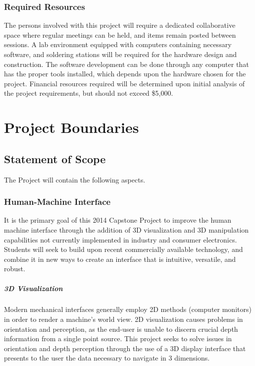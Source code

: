 \documentclass[11pt]{report}
\begin{document}
\subsection{Required Resources}
The persons involved with this project will require a dedicated collaborative space where regular meetings can be held, and items remain posted between sessions.
A lab environment equipped with computers containing necessary software, and soldering stations will be required for the hardware design and construction.
The software development can be done through any computer that has the proper tools installed, which depends upon the hardware chosen for the project.
Financial resources required will be determined upon initial analysis of the project requirements, but should not exceed \$5,000.

\chapter{Project Boundaries}
\section{Statement of Scope}
The Project will contain the following aspects.

\subsection{Human-Machine Interface}
It is the primary goal of this 2014 Capstone Project to improve the human machine interface through the addition of 3D visualization and 3D manipulation capabilities not currently implemented in industry and consumer electronics.
Students will seek to build upon recent commercially available technology, and combine it in new ways to create an interface that is intuitive, versatile, and robust.

\paragraph{3D Visualization}
Modern mechanical interfaces generally employ 2D methods (computer monitors) in order to render a machine's world view.
2D visualization causes problems in orientation and perception, as the end-user is unable to discern crucial depth information from a single point source.
This project seeks to solve issues in orientation and depth perception through the use of a 3D display interface that presents to the user the data necessary to navigate in 3 dimensions.
\end{document}

